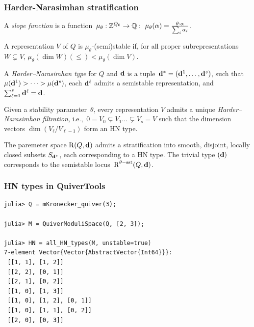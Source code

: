 \documentclass{beamer}
\begin{document}
\begin{frame}
    \frametitle{Harder-Narasimhan stratification}
A \emph{slope function} is a function~$\mu_{\theta} : \mathbb{Z}^{Q_0} \overset{}{\rightarrow} \mathbb{Q}: ~\mu_{\theta}(\alpha) = \frac{\theta \cdot \alpha}{\sum_i \alpha_i}$. \pause
\begin{definition} \pause
A representation $V$ of $Q$ is $\mu_{\theta}$-(semi)stable if, for all
proper subrepresentations $W \subsetneq V$,
$\mu_{\theta}(\dim W) (\leq)< \mu_{\theta}(\dim V)$. \pause

A \emph{Harder--Narasimhan type} for $Q$ and $\mathbf{d}$ is a
tuple~$\mathbf{d}^* = (\mathbf{d}^1,\dots,\mathbf{d}^s)$, such
that~$\mu(\mathbf{d}^1) > \dots > \mu(\mathbf{d}^s)$, each $\mathbf{d}^{\ell}$
admits a semistable representation,
and~$\sum_{\ell = 1}^{s}\mathbf{d}^{\ell} = \mathbf{d}$. \pause

Given a stability parameter~$\theta$, every representation $V$
admits a unique \emph{Harder--Narasimhan filtration},
i.e.,~$0 = V_0 \subsetneq V_1 \dots \subsetneq V_s = V$ such that the
dimension vectors $\dim(V_{\ell}/V_{\ell-1})$ form an HN type.
\end{definition} \pause

\begin{theorem}
The paremeter space $\operatorname{R}(Q, \mathbf{d})$ admits a stratification into
smooth, disjoint, locally closed subsets $S_{\mathbf{d}^*}$, each corresponding
to a HN type. The trivial type $(\mathbf{d})$ corresponds to the semistable
locus~$\operatorname{R}^{\theta-\mathrm{sst}}(Q, \mathbf{d})$.
\end{theorem}

\end{frame}

\begin{frame}[fragile]
    \frametitle{HN types in QuiverTools}
    \scriptsize{
\begin{lstlisting}
julia> Q = mKronecker_quiver(3);

julia> M = QuiverModuliSpace(Q, [2, 3]);

julia> HN = all_HN_types(M, unstable=true)
7-element Vector{Vector{AbstractVector{Int64}}}:
 [[1, 1], [1, 2]]
 [[2, 2], [0, 1]]
 [[2, 1], [0, 2]]
 [[1, 0], [1, 3]]
 [[1, 0], [1, 2], [0, 1]]
 [[1, 0], [1, 1], [0, 2]]
 [[2, 0], [0, 3]]
\end{lstlisting}
    }
\end{frame}
\end{document}
